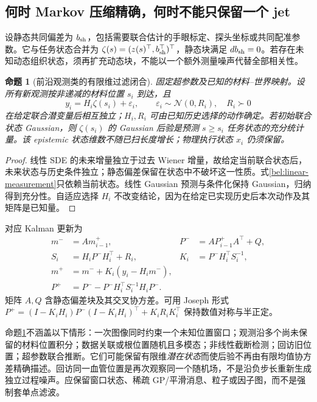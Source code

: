 \documentclass[11pt,a4paper]{article}
\numberwithin{equation}{section}
\newtheorem{proposition}[theorem]{命题}
\theoremstyle{definition}
\begin{document}
\subsection{何时 Markov 压缩精确，何时不能只保留一个 jet}
\label{bel:filter}

设静态共同偏差为 $b_{\rm sh}$，包括需要联合估计的手眼标定、探头坐标或共同配准参数。它与任务状态合并为
$\zeta(s)=(z(s)^\top,b_{\rm sh}^\top)^\top$，静态块满足 $db_{\rm sh}=0$。若存在未知动态组织状态，须再扩充动态块，不能以一个额外测量噪声代替全部相关性。

\begin{proposition}[前沿观测类的有限维过滤闭合]
\label{bel:prop-markov}
固定超参数及已知的材料--世界映射。设所有新观测按非递减的材料位置 $s_i$ 到达，且
\begin{equation}
 y_i=H_i\zeta(s_i)+\varepsilon_i,
 \qquad \varepsilon_i\sim\mathcal N(0,R_i),\quad R_i\succ0
 \label{bel:linear-measurement}
\end{equation}
在给定联合潜变量后相互独立；$H_i,R_i$ 可由已知历史选择的动作确定。若初始联合状态 Gaussian，则 $\zeta(s_i)$ 的 Gaussian 后验是预测 $s\ge s_i$ 任务状态的充分统计量。该 epistemic 状态维数不随已扫长度增长；物理执行状态 $x_i$ 仍须保留。
\end{proposition}
\begin{proof}
线性 SDE 的未来增量独立于过去 Wiener 增量，故给定当前联合状态后，未来状态与历史条件独立；静态偏差保留在状态中不破坏这一性质。式\eqref{bel:linear-measurement}只依赖当前状态。线性 Gaussian 预测与条件化保持 Gaussian，归纳得到充分性。自适应选择 $H_i$ 不改变结论，因为在给定已实现历史后本次动作及其矩阵是已知量。
\end{proof}

对应 Kalman 更新为
\begin{align}
 m^-&=A m^+_{i-1},&P^-&=A P^+_{i-1}A^\top+Q,\\
 S_i&=H_iP^-H_i^\top+R_i,&K_i&=P^-H_i^\top S_i^{-1},\\
 m^+&=m^-+K_i(y_i-H_im^-),\\
 P^+&=P^--P^-H_i^\top S_i^{-1}H_iP^-.
 \label{bel:kalman}
\end{align}
矩阵 $A,Q$ 含静态偏差块及其交叉协方差。可用 Joseph 形式
$P^+=(I-K_iH_i)P^-(I-K_iH_i)^\top+K_iR_iK_i^\top$ 保持数值对称与半正定。

命题\ref{bel:prop-markov}不涵盖以下情形：一次图像同时约束一个未知位置窗口；观测沿多个尚未保留的材料位置积分；数据关联或根位置随机且多模态；非线性截断检测；回访旧位置；超参数联合推断。它们可能保留有限维\emph{潜在状态}而使后验不再由有限均值协方差精确描述。回访同一血管位置是再次观察同一个随机场，不是沿负步长重新生成独立过程噪声。应保留窗口状态、稀疏 GP/平滑消息、粒子或因子图，而不是强制套单点滤波。
\end{document}
